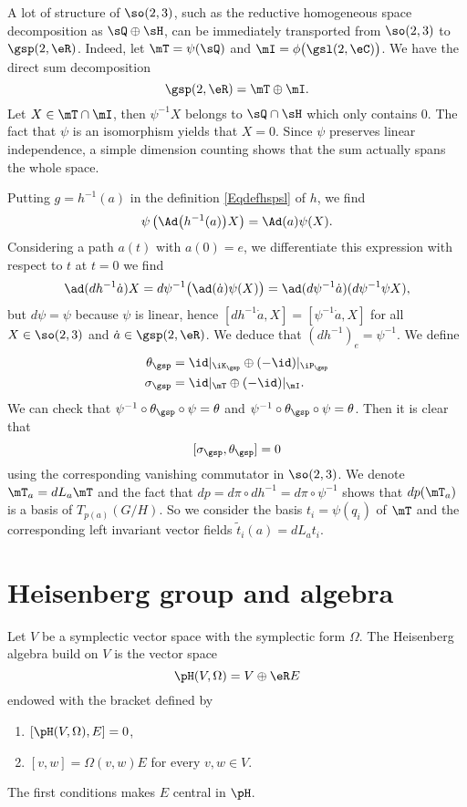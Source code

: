 A lot of structure of $\so(2,3)$, such as the reductive homogeneous space decomposition as $\sQ\oplus\sH$, can be immediately transported from $\so(2,3)$ to $\gsp(2,\eR)$. Indeed, let $\mT=\psi(\sQ)$ and $\mI=\phi\big( \gsl(2,\eC) \big)$. We have the direct sum decomposition
\[
	\gsp(2,\eR)=\mT\oplus\mI.
\]
Let $X\in\mT\cap\mI$, then $\psi^{-1}X$ belongs to $\sQ\cap\sH$ which only contains $0$. The fact that $\psi$ is an isomorphism yields that $X=0$. Since $\psi$ preserves linear independence, a simple dimension counting shows that the sum actually spans the whole space.

Putting $g=h^{-1}(a)$ in the definition \eqref{Eqdefhspsl} of $h$, we find
\[
	\psi\left( \Ad\big( h^{-1}(a) \big)X \right)=\Ad(a)\psi(X).
\]
Considering a path $a(t)$ with $a(0)=e$, we differentiate this expression with respect to $t$ at $t=0$ we find
\[
	\ad(dh^{-1}\dot a)X=d\psi^{-1}\big( \ad(\dot a)\psi(X) \big)=\ad(d\psi^{-1}\dot a)(d\psi^{-1}\psi X),
\]
but $d\psi=\psi$ because $\psi$ is linear, hence $[dh^{-1}\dot a,X]=[\psi^{-1}\dot a,X]$ for all $X\in \so(2,3)$ and $\dot a\in \gsp(2,\eR)$. We deduce that $(dh^{-1})_e=\psi^{-1}$. We define
\begin{align*}
	\theta_{\gsp} & =\id|_{\iK_{\gsp}}\oplus(-\id)|_{\iP_{\gsp}} \\
	\sigma_{\gsp} & =\id|_{\mT}\oplus(-\id)|_{\mI}.
\end{align*}
We can check that $\psi^{-1}\circ\theta_{\gsp}\circ\psi=\theta$ and $\psi^{-1}\circ\theta_{\gsp}\circ\psi=\theta$. Then it is clear that
\[
	[\sigma_{\gsp},\theta_{\gsp}]=0
\]
using the corresponding vanishing commutator in $\so(2,3)$. We denote $\mT_a=dL_a\mT$ and the fact that $dp= d\pi\circ dh^{-1}= d\pi\circ \psi^{-1}$ shows that $dp(\mT_a)$ is a basis of $T_{p(a)}(G/H)$. So we consider the basis $t_i=\psi(q_i)$ of $\mT$ and the corresponding left invariant vector fields $\tilde t_i(a)=dL_at_i$.


\section{Heisenberg group and algebra}


Let $V$ be a symplectic vector space with the symplectic form $\Omega$. The \hypertarget{HyperHeisenberg}{Heisenberg algebra} build on $V$ is the vector space
\begin{equation}
	\pH(V,\Omega)=V\oplus \eR E
\end{equation}
endowed with the bracket defined by
\begin{enumerate}

	\item
	      $[\pH(V,\Omega),E]=0$,
	\item
	      $[v,w]=\Omega(v,w)E$ for every $v,w\in V$.

\end{enumerate}
The first conditions makes $E$ central in $\pH$.

